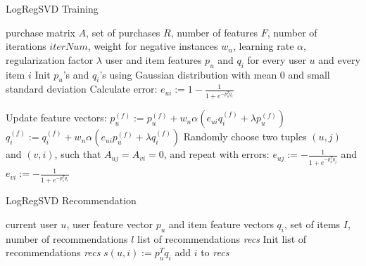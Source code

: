 \documentclass[10pt]{reportMaster}
\begin{document}
\begin{algorithm}
	\caption[LogRegSVD Training]{LogRegSVD Training}
	\label{alg:LogRegSVDTraining}
	\begin{algorithmic}[1]
		\Require purchase matrix $A$, set of purchases $R$, number of features $F$, number of iterations $iterNum$, weight for negative instances $w_n$, learning rate $\alpha$, regularization factor $\lambda$
		\Ensure user and item features $p_u$ and $q_i$ for every user $u$ and every item $i$
		\State Init $p_u$'s and $q_i$'s using Gaussian distribution with mean $0$ and small standard deviation
				\State Calculate error:
				\State $e_{ui} := 1 - \frac{1}{1 + e^{-p_u^Tq_i}}$
				
				\State Update feature vectors:
					\State $p_u^{(f)} := p_u^{(f)} + w_n \alpha (e_{ui} q_i^{(f)} + \lambda p_u^{(f)})$
					\State $q_i^{(f)} := q_i^{(f)} + w_n \alpha (e_{ui} p_u^{(f)} + \lambda q_i^{(f)})$
				\EndFor	
				\State Randomly choose two tuples $(u,j)$ and $(v,i)$, such that $A_{uj} = A_{vi} = 0$, and repeat with errors: 
				\State $e_{uj} := - \frac{1}{1 + e^{-p_u^Tq_j}}$ and
				\State $e_{vi} := - \frac{1}{1 + e^{-p_v^Tq_i}}$
			\EndFor
		\EndFor
	\end{algorithmic}	
\end{algorithm}


\begin{algorithm}
	\caption[LogRegSVD Recommendation]{LogRegSVD Recommendation}
	\label{alg:LogRegSVDRecommendation}
	\begin{algorithmic}[1]
		\Require current user $u$, user feature vector $p_u$ and item feature vectors $q_i$, set of items $I$, number of recommendations $l$
		\Ensure list of recommendations \textit{recs}
		\State Init list of recommendations \textit{recs}
			\State $s(u,i) := p_u^Tq_i$
			\State add $i$ to \textit{recs}
			\EndIf
		\EndFor
	\end{algorithmic}	
\end{algorithm}
\end{document}
